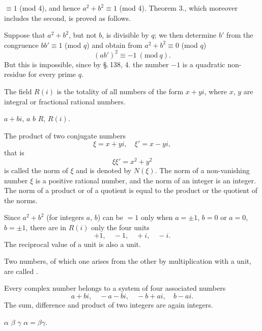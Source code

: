 
$\equiv 1$ (mod 4), and hence $a^2+b^2\equiv 1$ (mod 4). Theorem 3.,
which moreover includes the second, is proved as follows.

Suppose that $a^2+b^2$, but not $b$, is divisible by $q$;
we then determine $b'$ from the congruence $bb'\equiv 1$ (mod $q$) and
obtain from $a^2+b^2\equiv 0$ (mod $q$)
\[
(ab')^2\equiv -1\ (\mathrm{mod}\ q).
\]
But this is impossible, since by \S.\,138, 4. the number $-1$ is a
quadratic non-residue for every prime $q$.

The field $R(i)$ is the totality of all numbers of the
form $x+yi$, where $x$, $y$ are integral or fractional rational
numbers.

 $a+bi$,  $a$  $b$  $R$,  $R(i)$.

The product of two conjugate numbers
\[
\xi=x+yi,\quad \xi'=x-yi,
\]
that is
\[
\xi\xi'=x^2+y^2
\]
is called the norm of $\xi$ and is denoted by $N(\xi)$. The norm
of a non-vanishing number $\xi$ is a positive rational
number, and the norm of an integer is an integer. The
norm of a product or of a quotient is equal to the product
or the quotient of the norms.


Since $a^2+b^2$ (for integers $a$, $b$) can be $=1$ only
when $a=\pm 1$, $b=0$ or $a=0$, $b=\pm 1$, there are in
$R(i)$ only the four units
\[
+1,\quad -1,\quad +i,\quad -i.
\]
The reciprocal value of a unit is also a unit.

Two numbers, of which one arises from the other by
multiplication with a unit, are called .

Every complex number belongs to a system of four associated
numbers
\[
a+bi,\quad -a-bi,\quad -b+ai,\quad b-ai.
\]
The sum, difference and product of two integers are
again integers.

 $\alpha$  $\beta$
 $\gamma$  $\alpha=\beta\gamma$.
